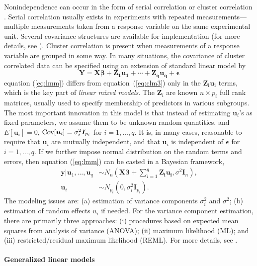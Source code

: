 Nonindependence can occur in the form of serial correlation or cluster correlation
\citep[chapter~17]{rencher2008linear}. Serial correlation usually exists in experiments with
repeated measurements---multiple measurements taken from a response variable on the same
experimental unit. Several covariance structures are available for implementation (for more details,
see \citet[chapter~5]{littell2006sas}).  Cluster correlation is present when measurements of a
response variable are grouped in some way. In many situations, the covariance of cluster correlated
data can be specified using an extension of standard linear model by 
\begin{equation}\label{eq:lmm}
	\bm Y = \bm {X\beta} + \bm {Z_1u_1}+\cdots + \bm {Z_qu_q} + \bm \epsilon	
\end{equation}
equation (\ref{eq:lmm}) differs from equation~(\ref{eq:clm3}) only in the $\bm {Z_iu_i}$ terms,
which is the key part of \textit{linear mixed models}.  The $\bm Z_i$  are known $n\times p_i$ full
rank matrices, usually used to specify membership of predictors in various subgroups. The most
important innovation in this model is that instead of estimating $\bm u_i$'s as fixed parameters, we
assume them to be unknown random quantities, and $E[\bm u_i]=0$, $\text{Cov}[\bm u_i]= \sigma_i^2 \bm
I_{p_i}$ for $i=1, \ldots, q$. It is, in many cases, reasonable to require that $\bm u_i$ are
mutually independent, and that $\bm u_i$ is independent of $\bm \epsilon$ for $i=1, \ldots, q$. If
we further impose normal distribution on the random terms and errors, then equation (\ref{eq:lmm})
can be casted in a Bayesian framework,
\begin{equation}\label{eq:lmmGuass}
	\begin{split}
		\bm y|\bm u_1, \ldots, \bm u_q   & \sim  N_n(\bm {X\beta} + \sum_{i=1}^q \bm {Z_iu_i}, \sigma^2\bm
		I_n),  \\
		\bm u_i &\sim N_{p_i}(0, \sigma_i^2 \bm I_{p_i}).
	\end{split}
\end{equation}
The modeling issues are: (a) estimation of variance components $\sigma_i^2$ and $\sigma^2$; (b)
estimation of random effects $u_i$ if needed. For the variance component estimation, there are
primarily three approaches: (i) procedures based on expected mean squares from analysis of variance
(ANOVA); (ii) maximum likelihood (ML); and (iii) restricted/residual maximum likelihood (REML). For
more details, see \citet[Chapter 1]{littell2006sas}.


\paragraph{Generalized linear models}\label{para:glm}

